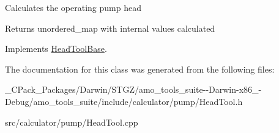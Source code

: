 Calculates the operating pump head \begin{DoxyReturn}{Returns}
unordered\+\_\+map with internal values calculated 
\end{DoxyReturn}


Implements \hyperlink{class_head_tool_base_ab8df8f908827ce45dc5e769ea0e10f0b}{Head\+Tool\+Base}.



The documentation for this class was generated from the following files\+:\begin{DoxyCompactItemize}
\item 
\+\_\+\+C\+Pack\+\_\+\+Packages/\+Darwin/\+S\+T\+G\+Z/amo\+\_\+tools\+\_\+suite-\/-\/\+Darwin-\/x86\+\_-\/\+Debug/amo\+\_\+tools\+\_\+suite/include/calculator/pump/Head\+Tool.\+h\item 
src/calculator/pump/Head\+Tool.\+cpp\end{DoxyCompactItemize}

